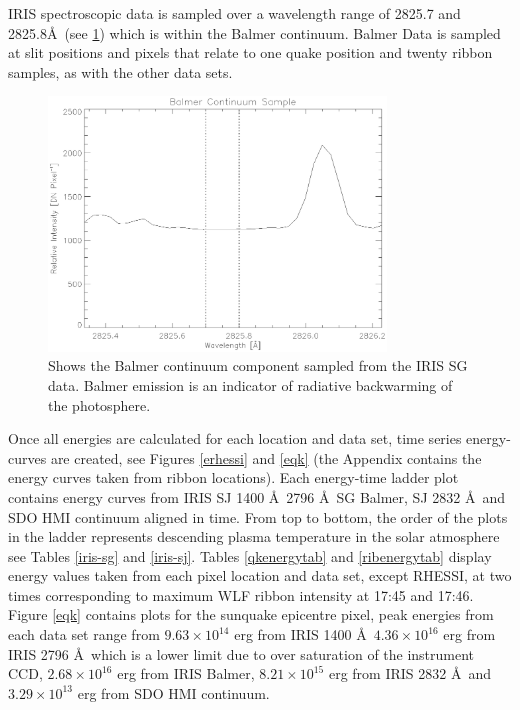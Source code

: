 IRIS spectroscopic data is sampled over a wavelength range of 2825.7 and 2825.8\AA\ (see \ref{balmercontinuum}) which is within the Balmer continuum. Balmer Data is sampled at slit positions and pixels that relate to one quake position and twenty ribbon samples, as with the other data sets. 

\begin{figure}[H]
  \begin{center}
  \includegraphics[width=0.8\textwidth]{29-Mar-14-Balmer-Continuum}
  \end{center}
  \caption{Shows the Balmer continuum component sampled from the IRIS SG data. Balmer emission is an indicator of radiative backwarming of the photosphere. }\label{balmercontinuum}
\end{figure}


Once all energies are calculated for each location and data set, time series energy-curves are created, see Figures \ref{erhessi} and \ref{eqk} (the Appendix contains the energy curves taken from ribbon locations). Each energy-time ladder plot contains energy curves from IRIS SJ 1400 \AA\, 2796 \AA\, SG Balmer, SJ 2832 \AA\ and SDO HMI continuum aligned in time. From top to bottom, the order of the plots in the ladder represents descending plasma temperature in the solar atmosphere see Tables \ref{iris-sg} and \ref{iris-sj}. Tables \ref{qkenergytab} and \ref{ribenergytab} display energy values taken from each pixel location and data set, except RHESSI, at two times corresponding to maximum WLF ribbon intensity at 17:45 and 17:46. Figure \ref{eqk} contains plots for the sunquake epicentre pixel, peak energies from each data set range from $9.63{\times}10^{14}$ erg from IRIS 1400 \AA\, $4.36{\times}10^{16}$ erg from IRIS 2796 \AA\ which is a lower limit due to over saturation of the instrument CCD, $2.68{\times}10^{16}$ erg from IRIS Balmer, $8.21{\times}10^{15}$ erg from IRIS 2832 \AA\ and $3.29{\times}10^{13}$ erg from SDO HMI continuum. 


